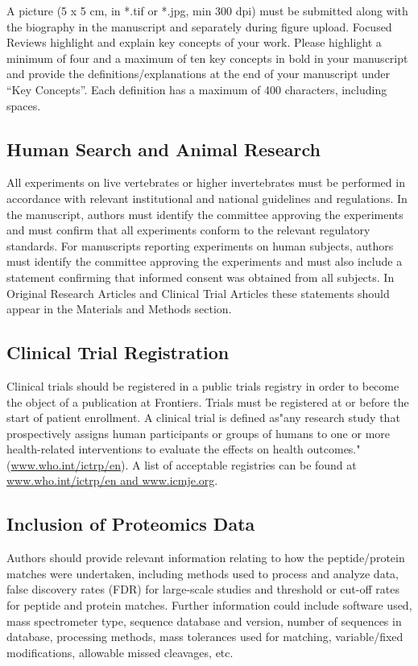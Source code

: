 \documentclass{frontiersSCNS} %
\begin{document}
A picture (5 x 5 cm, in *.tif or *.jpg, min 300 dpi) must be submitted along with the biography in the manuscript and separately during figure upload.
Focused Reviews highlight and explain key concepts of your work. Please highlight a minimum of four and a maximum of ten key concepts in bold in your manuscript and provide the definitions/explanations at the end of your manuscript under “Key Concepts”. Each definition has a maximum of 400 characters, including spaces.

\subsection{Human Search and Animal Research}

All experiments on live vertebrates or higher invertebrates must be performed in accordance with relevant institutional and national guidelines and regulations. In the manuscript, authors must identify the committee approving the experiments and must confirm that all experiments conform to the relevant regulatory standards. For manuscripts reporting experiments on human subjects, authors must identify the committee approving the experiments and must also include a statement confirming that informed consent was obtained from all subjects. In Original Research Articles and Clinical Trial Articles these statements should appear in the Materials and Methods section.

\subsection{Clinical Trial Registration}

Clinical trials should be registered in a public trials registry in order to become the object of a publication at Frontiers. Trials must be registered at or before the start of patient enrollment. A clinical trial is defined as"any research study that prospectively assigns human participants or groups of humans to one or more health-related interventions to evaluate the effects on health outcomes."(\url{www.who.int/ictrp/en}). A list of acceptable registries can be found at \url{www.who.int/ictrp/en and www.icmje.org}.

\subsection{Inclusion of Proteomics Data}

Authors should provide relevant information relating to how the peptide/protein matches were undertaken, including methods used to process and analyze data, false discovery rates (FDR) for large-scale studies and threshold or cut-off rates for peptide and protein matches. Further information could include software used, mass spectrometer type, sequence database and version, number of sequences in database, processing methods, mass tolerances used for matching, variable/fixed modifications, allowable missed cleavages, etc.
\end{document}
